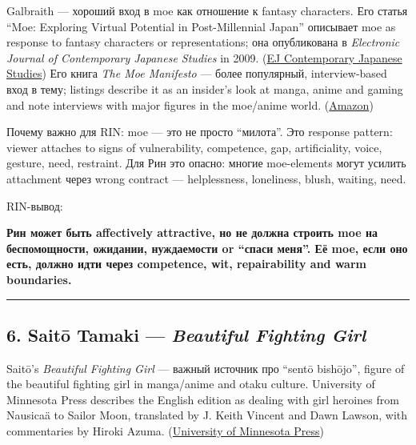 Galbraith --- хороший вход в moe как отношение к fantasy characters. Его
статья ``Moe: Exploring Virtual Potential in Post-Millennial Japan''
описывает moe as response to fantasy characters or representations; она
опубликована в \emph{Electronic Journal of Contemporary Japanese
Studies} in 2009.
(\href{https://www.japanesestudies.org.uk/articles/2009/Galbraith.html?utm_source=chatgpt.com}{EJ
Contemporary Japanese Studies}) Его книга \emph{The Moe Manifesto} ---
более популярный, interview-based вход в тему; listings describe it as
an insider's look at manga, anime and gaming and note interviews with
major figures in the moe/\hspace{0pt}anime world.
(\href{https://www.amazon.com/Moe-Manifesto-Insiders-Worlds-Gaming/dp/4805312823?utm_source=chatgpt.com}{Amazon})

Почему важно для RIN: moe --- это не просто ``милота''. Это response
pattern: viewer attaches to signs of vulnerability, competence, gap,
artificiality, voice, gesture, need, restraint. Для Рин это опасно:
многие moe-elements могут усилить attachment через wrong contract ---
helplessness, loneliness, blush, waiting, need.

RIN-вывод:

\textbf{Рин может быть affectively attractive, но не должна строить moe
на беспомощности, ожидании, нуждаемости or ``спаси меня''. Её moe, если
оно есть, должно идти через competence, wit, repairability and warm
boundaries.}

\begin{center}\rule{0.5\linewidth}{0.5pt}\end{center}

\subsection*{\texorpdfstring{6. Saitō Tamaki --- \emph{Beautiful Fighting
Girl}}{6. Saitō Tamaki --- Beautiful Fighting Girl}}

Saitō's \emph{Beautiful Fighting Girl} --- важный источник про ``sentō
bishōjo'', figure of the beautiful fighting girl in manga/\hspace{0pt}anime and
otaku culture. University of Minnesota Press describes the English
edition as dealing with girl heroines from Nausicaä to Sailor Moon,
translated by J. Keith Vincent and Dawn Lawson, with commentaries by
Hiroki Azuma.
(\href{https://www.upress.umn.edu/9781452916507/beautiful-fighting-girl/?utm_source=chatgpt.com}{University
of Minnesota Press})

